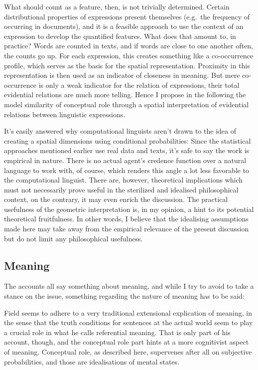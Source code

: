 \documentclass[11pt, a4paper]{article}
\begin{document}
What should count as a feature, then, is not trivially determined. Certain distributional properties of expressions present themselves (e.g.\ the frequency of occurring in documents), and it is a feasible approach to use the context of an expression to develop the quantified features. What does that amount to, in practice? Words are counted in texts, and if words are close to one another often, the counts go up. For each expression, this creates something like a co-occurrence profile, which serves as the basis for the spatial representation. Proximity in this representation is then used as an indicator of closeness in meaning. But mere co-occurrence is only a weak indicator for the relation of expressions, their total evidential relations are much more telling. Hence I propose in the following the model similarity of conceptual role through a spatial interpretation of evidential relations between linguistic expressions. 

It's easily answered why computational linguists aren't drawn to the idea of creating a spatial dimensions using conditional probabilities: Since the statistical approaches mentioned earlier use real data and texts, it's safe to say the work is empirical in nature. There is no actual agent's credence function over a natural language to work with, of course, which renders this angle a lot less favorable to the computational linguist. There are, however, theoretical implications which must not necessarily prove useful in the sterilized and idealised philosophical context, on the contrary, it may even enrich the discussion. The practical usefulness of the geometric interpretation is, in my opinion, a hint to its potential theoretical fruitfulness. In other words, I believe that the idealising assumptions made here may take away from the empirical relevance of the present discussion but do not limit any philosophical usefulness.

\subsection{Meaning}

The accounts all say something about meaning, and while I try to avoid to take a stance on the issue, something regarding the nature of meaning has to be said: 

Field seems to adhere to a very traditional extensional explication of meaning, in the sense that the truth conditions for sentences at the actual world seem to play a crucial role in what he calls referential meaning. That is only part of his account, though, and the conceptual role part hints at a more cognitivist aspect of meaning. Conceptual role, as described here, supervenes after all on subjective probabilities, and those are idealisations of mental states. 
\end{document}
